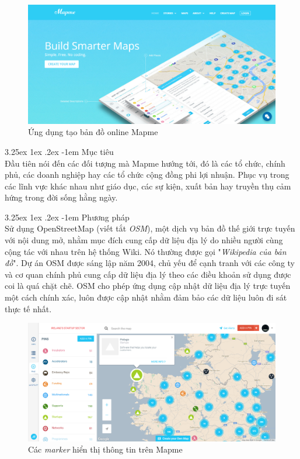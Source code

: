 \documentclass[12pt,a4paper]{article}
\makeatletter
\newcommand{\myparagraph}[1]{\paragraph{#1}\mbox{}\\} %
\renewcommand\paragraph{\@startsection{paragraph}{5}{\z@}%
  {3.25ex \@plus1ex \@minus.2ex}%
  {-1em}%
  {\normalfont\normalsize\bfseries}}
\makeatother
\begin{document}
\begin{figure}[!h]
	\begin{center}
    \includegraphics[scale=.4]{image/mapme}
    \caption{Ứng dụng tạo bản đồ online Mapme}
    \label{fig:mapme}
    \end{center}
\end{figure}

\myparagraph{Mục tiêu}
Đầu tiên nói đến các đối tượng mà Mapme hướng tới, đó là các tổ chức, chính phủ, các doanh nghiệp hay các tổ chức cộng đồng phi lợi nhuận. Phục vụ trong các lĩnh vực khác nhau như giáo dục, các sự kiện, xuất bản hay truyền thụ cảm hứng trong đời sống hằng ngày.

\myparagraph{Phương pháp}
Sử dụng OpenStreetMap (viết tắt \textit{OSM})\cite{osm}, một dịch vụ bản đồ thế giới trực tuyến với nội dung mở, nhằm mục đích cung cấp dữ liệu địa lý do nhiều người cùng cộng tác với nhau trên hệ thống Wiki. Nó thường được gọi "\textit{Wikipedia của bản đồ}". Dự án OSM được sáng lập năm 2004, chủ yếu để cạnh tranh với các công ty và cơ quan chính phủ cung cấp dữ liệu địa lý theo các điều khoản sử dụng được coi là quá chặt chẽ. OSM cho phép ứng dụng cập nhật dữ liệu địa lý trực tuyến một cách chính xác, luôn được cập nhật nhằm đảm bảo các dữ liệu luôn đi sát thực tế nhất.

\begin{figure}[!h]
	\begin{center}
    \includegraphics[scale=.4]{image/mapmeOSM}
    \caption{Các \textit{marker} hiển thị thông tin trên Mapme}
    \label{fig:mapmeOSM}
	\end{center}
\end{figure}
\end{document}
